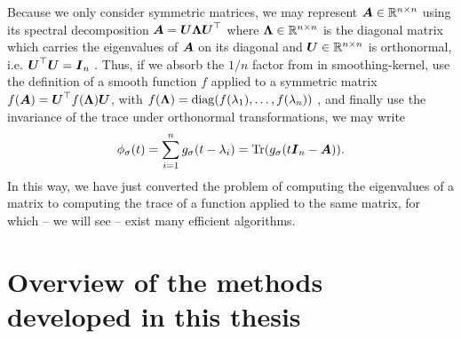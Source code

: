 Because we only consider symmetric matrices, 
we may represent $\boldsymbol{A} \in \mathbb{R}^{n \times n}$ using its spectral
decomposition $\boldsymbol{A} = \boldsymbol{U} \boldsymbol{\Lambda} \boldsymbol{U}^{\top}$ where
$\boldsymbol{\Lambda} \in \mathbb{R}^{n \times n}$ is the diagonal matrix which carries
the eigenvalues of $\boldsymbol{A}$ on its diagonal and $\boldsymbol{U} \in \mathbb{R}^{n \times n}$
is orthonormal, i.e. $\boldsymbol{U}^{\top} \boldsymbol{U} = \boldsymbol{I}_n$ \cite[theorem~4.1.5]{horn1985matrix}.
Thus, if we absorb the $1/n$ factor from 
in \gls{smoothing-kernel},
use the definition of a smooth function $f$ applied to a symmetric matrix
$f(\boldsymbol{A}) = \boldsymbol{U}^{\top} f(\boldsymbol{\Lambda}) \boldsymbol{U}$,
with $f(\boldsymbol{\Lambda}) = \operatorname{diag}(f(\lambda_1), \dots, f(\lambda_n))$ \cite[definition~1.2]{higham2008functions},
and finally use the invariance of the trace under orthonormal transformations, we may write
\begin{equation}
    \phi_{\sigma}(t) = \sum_{i=1}^n g_{\sigma}(t - \lambda_i) = \operatorname{Tr}(g_{\sigma}(t\boldsymbol{I}_n - \boldsymbol{A})).
    \label{equ:1-introduction-spectral-density-as-trace}
\end{equation}
In this way, we have just converted the problem of computing the eigenvalues of
a matrix to computing the trace of a function applied to the same matrix,
for which -- we will see -- exist many efficient algorithms.


\section{Overview of the methods developed in this thesis}
\label{sec:1-introduction-overview}

